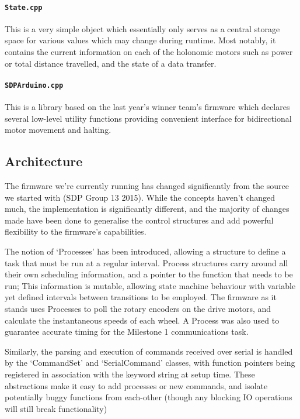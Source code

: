 \paragraph{\texttt{State.cpp}} This is a very simple object which essentially only serves as a central storage space for various values which may change during runtime. Most notably, it contains the current information on each of the holonomic motors such as power or total distance travelled, and the state of a data transfer.

\paragraph{\texttt{SDPArduino.cpp}} This is a library based on the last year's winner team's firmware which declares several low-level utility functions providing convenient interface for bidirectional motor movement and halting.

\subsection{Architecture}

The firmware we're currently running has changed significantly from the source we started with (SDP Group 13 2015). While the concepts haven't changed much, the implementation is significantly different, and the majority of changes made have been done to generalise the control structures and add powerful flexibility to the firmware's capabilities.

The notion of `Processes' has been introduced, allowing a structure to define a task that must be run at a regular interval. Process structures carry around all their own scheduling information, and a pointer to the function that needs to be run; This information is mutable, allowing state machine behaviour with variable yet defined intervals between transitions to be employed. The firmware as it stands uses Processes to poll the rotary encoders on the drive motors, and calculate the instantaneous speeds of each wheel. A Process was also used to guarantee accurate timing for the Milestone 1 communications task.

Similarly, the parsing and execution of commands received over serial is handled by the `CommandSet' and `SerialCommand' classes, with function pointers being registered in association with the keyword string at setup time. These abstractions make it easy to add processes or new commands, and isolate potentially buggy functions from each-other (though any blocking IO operations will still break functionality)

